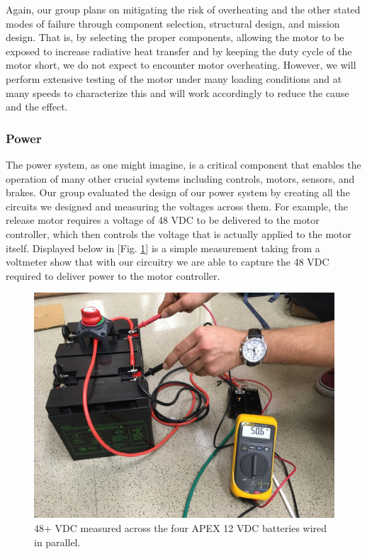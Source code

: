 Again, our group plans on mitigating the risk of overheating and the other stated modes of failure through component selection, structural design, and mission design. That is, by selecting the proper components, allowing the motor to be exposed to increase radiative heat transfer and by keeping the duty cycle of the motor short, we do not expect to encounter motor overheating. However, we will perform extensive testing of the motor under many loading conditions and at many speeds to characterize this and will work accordingly to reduce the cause and the effect. 


\subsubsection{Power\label{sss:PowerRisk}}

\indent\indent The power system, as one might imagine, is a critical component that enables the operation of many other crucial systems including controls, motors, sensors, and brakes. Our group evaluated the design of our power system by creating all the circuits we designed and measuring the voltages across them. For example, the release motor requires a voltage of 48 VDC to be delivered to the motor controller, which then controls the voltage that is actually applied to the motor itself. Displayed below in [Fig. \ref{fig:RealPower2}] is a simple measurement taking from a voltmeter show that with our circuitry we are able to capture the 48 VDC required to deliver power to the motor controller. 

\begin{figure}[ht]
  \centering
  \includegraphics[width=.8\textwidth]{TUMBR/RealPower.JPG}
  \caption{\label{fig:RealPower2} 48+ VDC measured across the four APEX 12 VDC batteries wired in parallel.}
\end{figure}

